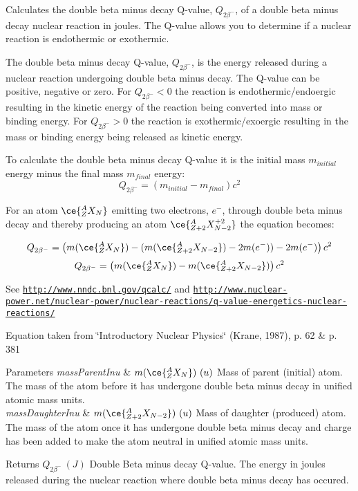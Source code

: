 Calculates the double beta minus decay Q-\/value, $Q_{2\beta^-}$, of a double beta minus decay nuclear reaction in joules. The Q-\/value allows you to determine if a nuclear reaction is endothermic or exothermic. 

The double beta minus decay Q-\/value, $Q_{2\beta^-}$, is the energy released during a nuclear reaction undergoing double beta minus decay. The Q-\/value can be positive, negative or zero. For $Q_{2\beta^-} < 0$ the reaction is endothermic/endoergic resulting in the kinetic energy of the reaction being converted into mass or binding energy. For $Q_{2\beta^-} > 0$ the reaction is exothermic/exoergic resulting in the mass or binding energy being released as kinetic energy.

To calculate the double beta minus decay Q-\/value it is the initial mass $m_{initial}$ energy minus the final mass $m_{final}$ energy\+: \[Q_{2\beta^-} = \left ( m_{initial}-m_{final}\right ) c^2\]

For an atom $\ce{ ^{A}_{Z}X_{N} }$ emitting two electrons, $e^-$, through double beta minus decay and thereby producing an atom $\ce{ ^{A}_{Z{+2}}X^{+2}_{N-2} }$ the equation becomes\+:

\[Q_{2\beta^-} = \left ( m(\ce{ ^{A}_{Z}X_{N} }) - (m(\ce{ ^{A}_{Z{+2}}X_{N-2} }) - 2m(e^-)) - 2m(e^-)\right ) c^2\] \[Q_{2\beta^-} = \left ( m(\ce{ ^{A}_{Z}X_{N} }) - m(\ce{ ^{A}_{Z{+2}}X_{N-2} })\right ) c^2\]

See \href{http://www.nndc.bnl.gov/qcalc/}{\tt http\+://www.\+nndc.\+bnl.\+gov/qcalc/} and \href{http://www.nuclear-power.net/nuclear-power/nuclear-reactions/q-value-energetics-nuclear-reactions/}{\tt http\+://www.\+nuclear-\/power.\+net/nuclear-\/power/nuclear-\/reactions/q-\/value-\/energetics-\/nuclear-\/reactions/}

Equation taken from \char`\"{}\+Introductory Nuclear Physics\char`\"{} (Krane, 1987), p. 62 \& p. 381


\begin{DoxyParams}{Parameters}
{\em mass\+Parent\+Inu} & $m(\ce{ ^{A}_{Z}X_{N} })\ (u)$ Mass of parent (initial) atom. The mass of the atom before it has undergone double beta minus decay in unified atomic mass units. \\
\hline
{\em mass\+Daughter\+Inu} & $m(\ce{ ^{A}_{Z{+2}}X_{N-2} })\ (u)$ Mass of daughter (produced) atom. The mass of the atom once it has undergone double beta minus decay and charge has been added to make the atom neutral in unified atomic mass units. \\
\hline
\end{DoxyParams}
\begin{DoxyReturn}{Returns}
$Q_{2\beta^-}\ (J)$ Double Beta minus decay Q-\/value. The energy in joules released during the nuclear reaction where double beta minus decay has occured. 
\end{DoxyReturn}
\mbox{\label{group___e_g_x_phys-_q_value_ga0eefdd84aa89d210e00dca043368dfeb}} 
